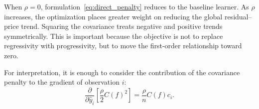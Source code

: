 \documentclass[10pt]{article}
\theoremstyle{definition}
\newcommand{\1}{\mathbf{1}}
\begin{document}
When $\rho=0$, formulation~\eqref{eq:direct_penalty} reduces to the baseline learner. As $\rho$ increases, the optimization places greater weight on reducing the global residual--price trend. Squaring the covariance treats negative and positive trends symmetrically. This is important because the objective is not to replace regressivity with progressivity, but to move the first-order relationship toward zero.




{For interpretation, it is enough to consider the contribution of the covariance penalty to the gradient of observation $i$:}
{
\begin{equation}
\label{eq:direct_penalty_gradient}
\frac{\partial}{\partial \widehat y_i}
\left[
\frac{\rho}{2}C(f)^2
\right]
=
\frac{\rho}{n}C(f)c_i.
\end{equation}
}



\end{document}
